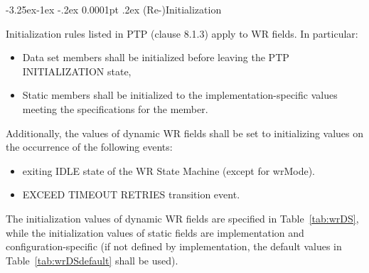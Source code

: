 \documentclass[a4paper, 12pt]{article}
\makeatletter
\renewcommand\paragraph{\@startsection{paragraph}{4}{\z@}%
                                     {-3.25ex\@plus -1ex \@minus -.2ex}%
                                     {0.0001pt \@plus .2ex}%
                                     {\normalfont\normalsize\bfseries}}
\makeatother
\begin{document}
\addtocounter{footnote}{4}

\newpage

\paragraph{(Re-)Initialization}
\label{sec:initialization}

Initialization rules listed in PTP (clause 8.1.3) apply to WR fields. 
In particular:
\begin{itemize}
  \item Data set members shall be initialized before leaving the PTP INITIALIZATION state,
  \item Static members shall be initialized to the implementation-specific values meeting the 
        specifications for the member.
\end{itemize}
Additionally, the values of dynamic WR fields shall be set to initializing values on the occurrence 
of the following events:
\begin{itemize}
  \item exiting IDLE state of the WR State Machine (except for wrMode).
  \item EXCEED TIMEOUT RETRIES transition event.
\end{itemize}
The initialization values of dynamic WR fields are specified in Table~\ref{tab:wrDS}, while 
the initialization values of static fields are implementation and configuration-specific 
(if not defined by implementation, the default values in Table~\ref{tab:wrDSdefault} shall be used).
\end{document}
